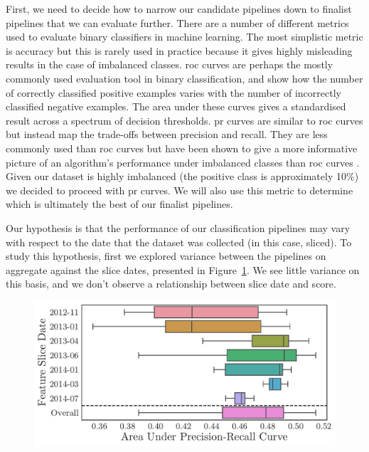 \documentclass[../thesis/thesis.tex]{subfiles}
\begin{document}
First, we need to decide how to narrow our candidate pipelines down to finalist pipelines that we can evaluate further. There are a number of different metrics used to evaluate binary classifiers in machine learning. The most simplistic metric is accuracy but this is rarely used in practice because it gives highly misleading results in the case of imbalanced classes. \Gls{roc} curves are perhaps the mostly commonly used evaluation tool in binary classification, and show how the number of correctly classified positive examples varies with the number of incorrectly classified negative examples. The area under these curves gives a standardised result across a spectrum of decision thresholds. \Gls{pr} curves are similar to \gls{roc} curves but instead map the trade-offs between precision and recall. They are less commonly used than \gls{roc} curves but have been shown to give a more informative picture of an algorithm’s performance under imbalanced classes than \gls{roc} curves \cite{Jesse Davis 2006}. Given our dataset is highly imbalanced (the positive class is approximately 10\%) we decided to proceed with \gls{pr} curves. We will also use this metric to determine which is ultimately the best of our finalist pipelines.

Our hypothesis is that the performance of our classification pipelines may vary with respect to the date that the dataset was collected (in this case, sliced). To study this hypothesis, first we explored variance between the pipelines on aggregate against the slice dates, presented in Figure~\ref{fig:evaluation:selection_agg_slice}. We see little variance on this basis, and we don't observe a relationship between slice date and score.

\begin{figure}[!htb]
    \centering
    \includegraphics[width=\textwidth]{../figures/evaluation/selection_agg_slice}
    \caption[Pipeline performance by slice date]{}
    \label{fig:evaluation:selection_agg_slice}
\end{figure}
\end{document}
